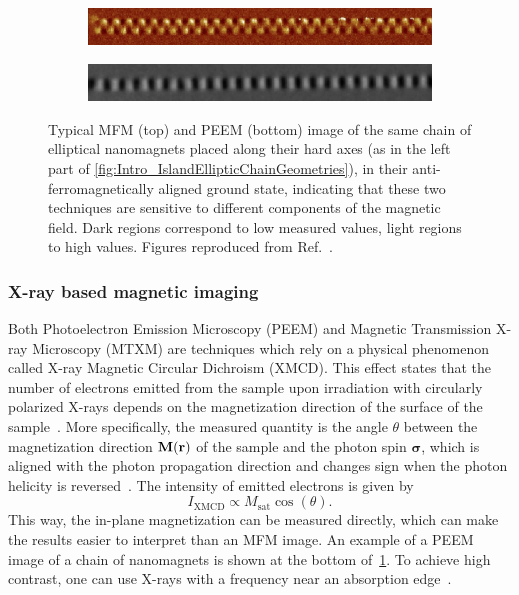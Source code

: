 \documentclass[11pt,a4paper,english]{article}
\renewcommand{\vec}[1]{\boldsymbol{#1}}
\begin{document}
\begin{figure}
     \centering
     \begin{subfigure}[b]{0.8\textwidth}
         \centering
         \includegraphics[width=\textwidth]{Figures/Introduction/NML_Carlton - Figure 1.15 cropped.png}
     \end{subfigure}
     \begin{subfigure}[b]{0.8\textwidth}
         \centering
         \includegraphics[width=\textwidth]{Figures/Introduction/NML_Carlton - Figure 1.17 cropped.png}
     \end{subfigure}
     \caption{Typical MFM (top) and PEEM (bottom) image of the same chain of elliptical nanomagnets placed along their hard axes (as in the left part of \cref{fig:Intro_IslandEllipticChainGeometries}), in their anti-ferromagnetically aligned ground state, indicating that these two techniques are sensitive to different components of the magnetic field. Dark regions correspond to low measured values, light regions to high values. Figures reproduced from Ref.~\cite{NML_Carlton}.}
     \label{fig:Intro_Imaging}
\end{figure}

\subsubsection{X-ray based magnetic imaging}
Both Photoelectron Emission Microscopy (PEEM) and Magnetic Transmission X-ray Microscopy (MTXM) are techniques which rely on a physical phenomenon called X-ray Magnetic Circular Dichroism (XMCD). This effect states that the number of electrons emitted from the sample upon irradiation with circularly polarized X-rays depends on the magnetization direction of the surface of the sample~\cite{NML_Carlton}. More specifically, the measured quantity is the angle $\theta$ between the magnetization direction $\vb{M(\vb{r})}$ of the sample and the photon spin $\vec{\sigma}$, which is aligned with the photon propagation direction and changes sign when the photon helicity is reversed~\cite{PEEM}. The intensity of emitted electrons is given by
\begin{equation}
    I_{\mathrm{XMCD}} \propto M_\mathrm{sat} \cos(\theta) \mathrm{.}
    \label{eq:XMCD}
\end{equation} 
This way, the in-plane magnetization can be measured directly, which can make the results easier to interpret than an MFM image. An example of a PEEM image of a chain of nanomagnets is shown at the bottom of~\cref{fig:Intro_Imaging}. To achieve high contrast, one can use X-rays with a frequency near an absorption edge~\cite{SubnanosecondPropagation_AnisotropyChains}. \par
\end{document}
